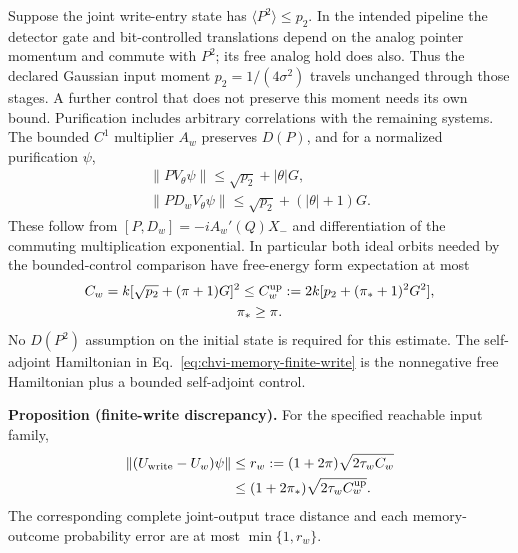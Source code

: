 Suppose the joint write-entry state has $\langle P^2\rangle\leq p_2$.
In the intended pipeline the detector gate and bit-controlled translations
depend on the analog pointer momentum and commute with $P^2$; its free
analog hold does also. Thus the declared Gaussian input moment
$p_2=1/(4\sigma^2)$ travels unchanged through those stages. A further
control that does not preserve this moment needs its own bound.
Purification includes arbitrary correlations with the remaining systems.
The bounded $C^1$ multiplier $A_w$ preserves $D(P)$, and for a normalized
purification $\psi$,
\begin{equation}
\begin{gathered}
\|PV_\theta\psi\|\leq\sqrt{p_2}+|\theta|G,
 \\
 \|PD_wV_\theta\psi\|\leq\sqrt{p_2}+(|\theta|+1)G.
\end{gathered}
\label{eq:chvi-memory-derivative-estimates}
\end{equation}
These follow from $[P,D_w]=-iA_w'(Q)X_-$ and differentiation of the
commuting multiplication exponential. In particular both ideal orbits
needed by the bounded-control comparison have free-energy form expectation
at most
\begin{equation}
\begin{gathered}
C_w=k[\sqrt{p_2}+(\pi+1)G]^2
 \leq C_w^{\rm up}:=2k[p_2+(\pi_*+1)^2G^2],\\
\pi_*\geq\pi.
\end{gathered}
\label{eq:chvi-memory-write-energy}
\end{equation}
No $D(P^2)$ assumption on the initial state is required for this estimate.
The self-adjoint Hamiltonian in Eq.~\eqref{eq:chvi-memory-finite-write}
is the nonnegative free Hamiltonian plus a bounded self-adjoint control.

\noindent\textbf{Proposition (finite-write discrepancy).}
For the specified reachable input family,
\begin{equation}
\begin{aligned}
 \|(U_{\rm write}-U_w)\psi\|
 &\leq r_w:=(1+2\pi)\sqrt{2\tau_w C_w}\\
 &\leq(1+2\pi_*)\sqrt{2\tau_w C_w^{\rm up}}.
\end{aligned}
\label{eq:chvi-memory-write-discrepancy}
\end{equation}
The corresponding complete joint-output trace distance and each
memory-outcome probability error are at most $\min\{1,r_w\}$.

